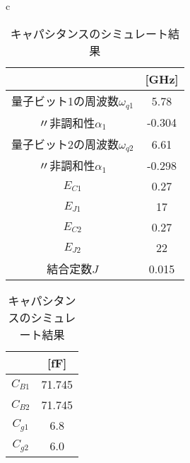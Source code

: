 \begin{table}[H]
    \begin{center}
    \begin{tabular}{c}
        \begin{minipage}{0.45\hsize}
            \begin{center}
                \caption{量子ビット1,2の周波数単位のパラメータ}
                \begin{tabular}{|c|c|}
                    \hline
                    & [GHz] \\
                    \hline
                    \hline
                        量子ビット1の周波数$\omega_{q1}$ & 5.78 \\
                    \hline
                        〃非調和性$\alpha_{1}$ & -0.304\\
                    \hline
                        量子ビット2の周波数$\omega_{q2}$ & 6.61 \\
                    \hline
                        〃非調和性$\alpha_{1}$ & -0.298 \\
                    \hline
                        $E_{C1}$ & 0.27 \\
                    \hline
                        $E_{J1}$ & 17 \\
                    \hline
                        $E_{C2}$ & 0.27 \\
                    \hline
                        $E_{J2}$ & 22 \\
                    \hline
                        結合定数$J$ & 0.015\\
                    \hline
                \end{tabular}
            \end{center}
        \end{minipage}

        \begin{minipage}{0.4\hsize}
            \begin{center}
              \caption{キャパシタンスのシミュレート結果}
              \begin{tabular}{|c|c|}
                \hline
                \hline
                 & [fF]\\ 
                \hline 
                \hline
                $C_{B1}$ & 71.745 \\
                $C_{B2}$ & 71.745\\
                $C_{g1}$ &  6.8\\
                $C_{g2}$ &  6.0\\
                \hline
              \end{tabular}
            \end{center}
          \end{minipage}
        \end{tabular}
    \end{center}
\end{table}

